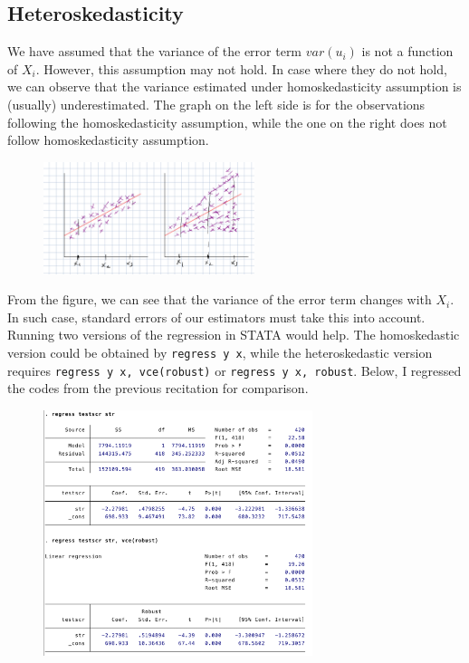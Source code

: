 \documentclass[12pt]{article}
\theoremstyle{definition}
\theoremstyle{property}
\theoremstyle{assumption}
\theoremstyle{example}
\theoremstyle{comment}
\begin{document}
\subsection{Heteroskedasticity}
We have assumed that the variance of the error term $var(u_i)$ is not a function of $X_i$. However, this assumption may not hold. In case where they do not hold, we can observe that the variance estimated under homoskedasticity assumption is (usually) underestimated. The graph on the left side is for the observations following the homoskedasticity assumption, while the one on the right does not follow homoskedasticity assumption.
\begin{figure}[H]
\centering
\includegraphics[width=0.55\textwidth]{hetero.png}
\end{figure}
\par\medskip
From the figure, we can see that the variance of the error term changes with $X_i$. In such case, standard errors of our estimators must take this into account. Running two versions of the regression in STATA would help. The homoskedastic version could be obtained by \texttt{regress y x}, while the heteroskedastic version requires \texttt{regress y x, vce(robust)} or \texttt{regress y x, robust}.  Below, I regressed the codes from the previous recitation for comparison. \par\medskip
\begin{figure}[H]
\centering
\includegraphics[width=0.7\textwidth]{heterovhomo.png}
\end{figure}
\end{document}
